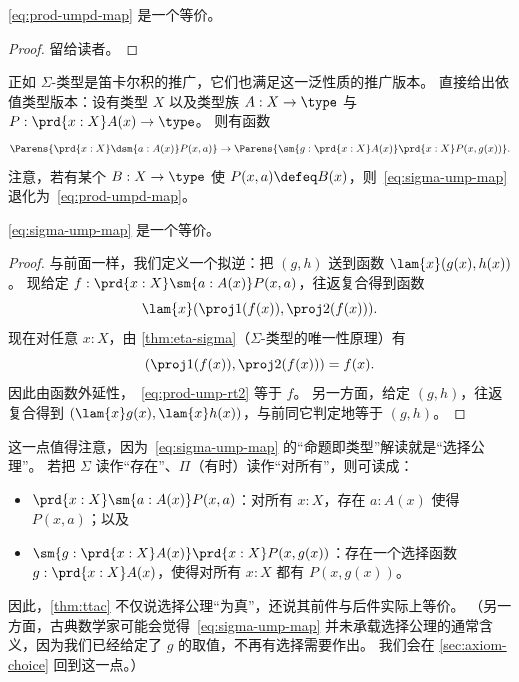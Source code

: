 \begin{thm}\label{thm:prod-umpd}
  \eqref{eq:prod-umpd-map} 是一个等价。
\end{thm}
\begin{proof}
  留给读者。
\end{proof}

正如 $\Sigma$-类型是笛卡尔积的推广，它们也满足这一泛性质的推广版本。
直接给出依值类型版本：设有类型 $X$ 以及类型族 $A:X\to \type$ 与 $P:\prd{x:X} A(x)\to\type$。
则有函数
%
\begin{equation}
  \label{eq:sigma-ump-map}
  \Parens{\prd{x:X}\dsm{a:A(x)} P(x,a)} \to
  \Parens{\sm{g:\prd{x:X} A(x)} \prd{x:X} P(x,g(x))}.
\end{equation}
注意，若有某个 $B:X\to\type$ 使 $P(x,a) \defeq B(x)$，则~\eqref{eq:sigma-ump-map} 退化为~\eqref{eq:prod-umpd-map}。

\begin{thm}\label{thm:ttac}
  \eqref{eq:sigma-ump-map} 是一个等价。
\end{thm}
\begin{proof}
  与前面一样，我们定义一个拟逆：把 $(g,h)$ 送到函数 $\lam{x} (g(x),h(x))$。
  现给定 $f:\prd{x:X} \sm{a:A(x)} P(x,a)$，往返复合得到函数
  \begin{equation}
    \lam{x} (\proj1(f(x)),\proj2(f(x))).\label{eq:prod-ump-rt2}
  \end{equation}
  现在对任意 $x:X$，由 \cref{thm:eta-sigma}（$\Sigma$-类型的唯一性原理）有
  \begin{equation*}
    (\proj1(f(x)),\proj2(f(x))) = f(x).
  \end{equation*}
  因此由函数外延性，~\eqref{eq:prod-ump-rt2} 等于 $f$。
  另一方面，给定 $(g,h)$，往返复合得到 $(\lam {x} g(x),\lam{x} h(x))$，与前同它判定地等于 $(g,h)$。
\end{proof}

这一点值得注意，因为~\eqref{eq:sigma-ump-map} 的“命题即类型”解读就是“选择公理”。
若把 $\Sigma$ 读作“存在”、$\Pi$（有时）读作“对所有”，则可读成：
\begin{itemize}
\item $\prd{x:X} \sm{a:A(x)} P(x,a)$：对所有 $x:X$，存在 $a:A(x)$ 使得 $P(x,a)$；以及
\item $\sm{g:\prd{x:X} A(x)} \prd{x:X} P(x,g(x))$：存在一个选择函数 $g:\prd{x:X} A(x)$，使得对所有 $x:X$ 都有 $P(x,g(x))$。
\end{itemize}
因此，\cref{thm:ttac} 不仅说选择公理“为真”，还说其前件与后件实际上等价。
（另一方面，古典数学家可能会觉得~\eqref{eq:sigma-ump-map} 并未承载选择公理的通常含义，因为我们已经给定了 $g$ 的取值，不再有选择需要作出。
我们会在 \cref{sec:axiom-choice} 回到这一点。）


